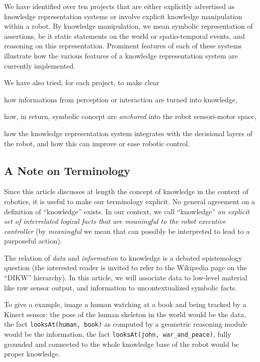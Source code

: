 \documentclass[a4paper, twocolumn]{article}
\newcommand{\concept}[1]{{\footnotesize \texttt{#1}}}
\begin{document}
We have identified over ten projects that are either explicitly advertised as
knowledge representation systems or involve explicit knowledge manipulation
within a robot. By knowledge manipulation, we mean symbolic representation of
assertions, be it static statements on the world or spatio-temporal events, and
reasoning on this representation. Prominent features of each of these systems
illustrate how the various features of a knowledge representation system are
currently implemented.

We have also tried, for each project, to make clear \begin{inparaenum} \item
how informations from perception or interaction are turned into knowledge,
\item how, in return, symbolic concept are \emph{anchored} into the robot
sensori-motor space, \item how the knowledge representation system integrates
with the decisional layers of the robot, and how this can improve or ease
robotic control.\end{inparaenum}

\subsection*{A Note on Terminology}

Since this article discusses at length the concept of knowledge in the context
of robotics, it is useful to make our terminology explicit.  No general
agreement on a definition of ``knowledge'' exists. In our context, we call
``knowledge'' \emph{an explicit set of interrelated logical facts that are
meaningful to the robot executive controller} (by \emph{meaningful} we mean
that can possibly be interpreted to lead to a purposeful action).

The relation of \emph{data} and \emph{information} to knowledge is a debated
epistemology question (the interested reader is invited to refer to the
Wikipedia page on the ``DIKW'' hierarchy). In this article, we will associate
data to low-level material like raw sensor output, and information to
uncontextualized symbolic facts.

To give a example, image a human watching at a book and being tracked by a
Kinect sensor: the pose of the human skeleton in the world would be the data,
the fact \concept{looksAt(human, book)} as computed by a geometric reasoning
module would be the information, the fact \concept{looksAt(john,
war\_and\_peace)}, fully grounded and connected to the whole knowledge base of
the robot would be proper knowledge.
\end{document}
